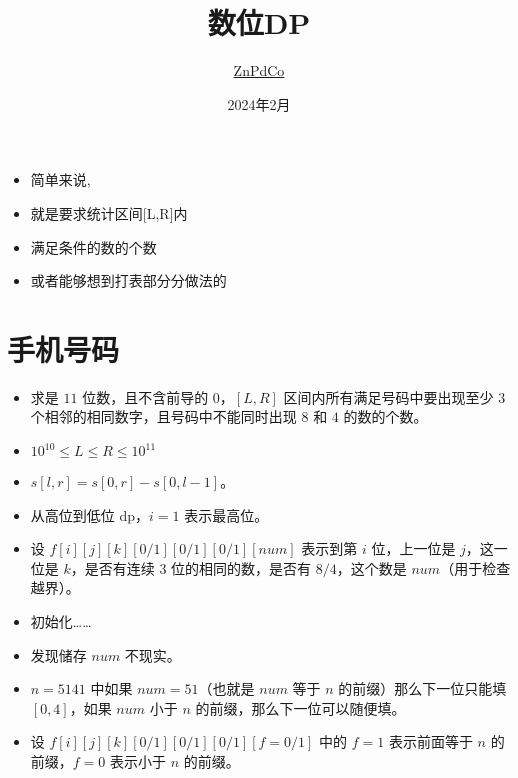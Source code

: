 \documentclass[serif]{beamer}
\title{数位DP}
\author{\href{https://www.cnblogs.com/znpdco}{ZnPdCo}}
\date{2024年2月}
\begin{document}
\begin{frame}
  \titlepage
\end{frame}

\begin{frame}
  \begin{itemize}[<+-| alert@+>]
    \item 简单来说,
    \item 就是要求统计区间[L,R]内
    \item 满足条件的数的个数
    \item 或者能够想到打表部分分做法的
  \end{itemize}
\end{frame}

\section{手机号码}

\begin{frame}
  \begin{itemize}
    \item 求是 $11$ 位数，且不含前导的 $0$，$[L,R]$ 区间内所有满足号码中要出现至少 $3$ 个相邻的相同数字，且号码中不能同时出现 $8$ 和 $4$ 的数的个数。
    \item $10^{10}\le L\le R\le 10^{11}$
  \end{itemize}
\end{frame}

\begin{frame}
  \begin{itemize}[<+-| alert@+>]
    \item $s[l,r]=s[0,r]-s[0,l-1]$。
    \item 从高位到低位 dp，$i=1$ 表示最高位。
    \item 设 $f[i][j][k][0/1][0/1][0/1][num]$ 表示到第 $i$ 位，上一位是 $j$，这一位是 $k$，是否有连续 $3$ 位的相同的数，是否有 $8/4$，这个数是 $num$（用于检查越界）。
    \item 初始化……
  \end{itemize}
\end{frame}

\begin{frame}
  \begin{itemize}[<+-| alert@+>]
    \item 发现储存 $num$ 不现实。
    \item $n=5141$ 中如果 $num=51$（也就是 $num$ 等于 $n$ 的前缀）那么下一位只能填 $[0,4]$，如果 $num$ 小于 $n$ 的前缀，那么下一位可以随便填。
    \item 设 $f[i][j][k][0/1][0/1][0/1][f=0/1]$ 中的 $f=1$ 表示前面等于 $n$ 的前缀，$f=0$ 表示小于 $n$ 的前缀。
  \end{itemize}
\end{frame}
\end{document}
